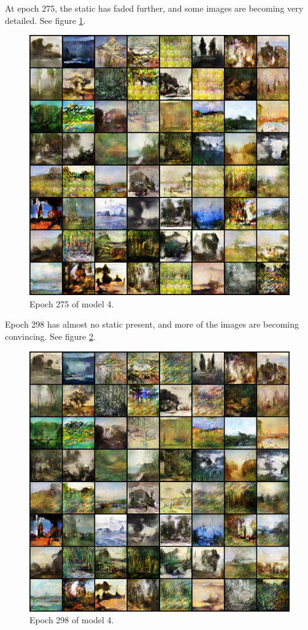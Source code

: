 \documentclass[11pt,letterpaper]{article}
\begin{document}
				At epoch 275, the static has faded further, and some images are becoming very detailed.
				See figure \ref{fig:wa64:epoch275generator}.
				\begin{figure}
					\centering
					\includegraphics[width=1.0\linewidth]{results/model4/epoch275_generator}
					\caption{Epoch 275 of model 4.}
					\label{fig:wa64:epoch275generator}
				\end{figure}

				Epoch 298 has almost no static present, and more of the images are becoming convincing.
				See figure \ref{fig:wa64:epoch298generator}.
				\begin{figure}
					\centering
					\includegraphics[width=1.0\linewidth]{results/model4/epoch298_generator}
					\caption{Epoch 298 of model 4.}
					\label{fig:wa64:epoch298generator}
				\end{figure}
\end{document}
